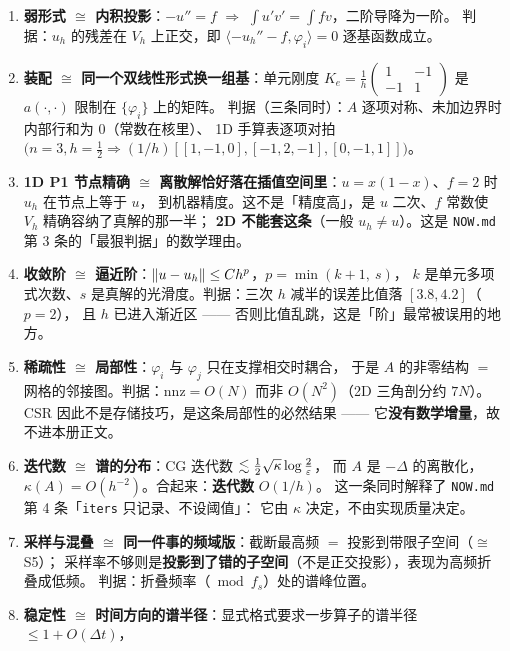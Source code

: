 \begin{enumerate}[leftmargin=1.5em]
  \item \textbf{弱形式 $\cong$ 内积投影}：$-u''=f$ $\Rightarrow$ $\int u'v'=\int fv$，二阶导降为一阶。
        判据：$u_h$ 的残差在 $V_h$ 上正交，即 $\langle -u_h''-f,\varphi_i\rangle=0$ 逐基函数成立。
  \item \textbf{装配 $\cong$ 同一个双线性形式换一组基}：单元刚度
        $K_e=\frac1h\begin{pmatrix}1&-1\\-1&1\end{pmatrix}$ 是 $a(\cdot,\cdot)$ 限制在 $\{\varphi_i\}$ 上的矩阵。
        判据（三条同时）：$A$ 逐项对称、未加边界时内部行和为 $0$（常数在核里）、
        1D 手算表逐项对拍 $\bigl(n=3,h=\tfrac12\Rightarrow (1/h)[[1,-1,0],[-1,2,-1],[0,-1,1]]\bigr)$。
  \item \textbf{1D P1 节点精确 $\cong$ 离散解恰好落在插值空间里}：$u=x(1-x)$、$f=2$ 时 $u_h$ 在节点上等于 $u$，
        到机器精度。这不是「精度高」，是 $u$ 二次、$f$ 常数使 $V_h$ 精确容纳了真解的那一半；
        \textbf{2D 不能套这条}（一般 $u_h\ne u$）。这是 \texttt{NOW.md} 第 3 条的「最狠判据」的数学理由。
  \item \textbf{收敛阶 $\cong$ 逼近阶}：$\left\lVert u-u_h\right\rVert\le Ch^{p}$，$p=\min(k+1,\ s)$，
        $k$ 是单元多项式次数、$s$ 是真解的光滑度。判据：三次 $h$ 减半的误差比值落 $[3.8,4.2]$（$p=2$），
        且 $h$ 已进入渐近区 —— 否则比值乱跳，这是「阶」最常被误用的地方。
  \item \textbf{稀疏性 $\cong$ 局部性}：$\varphi_i$ 与 $\varphi_j$ 只在支撑相交时耦合，
        于是 $A$ 的非零结构 $=$ 网格的邻接图。判据：$\mathrm{nnz}=O(N)$ 而非 $O(N^{2})$（2D 三角剖分约 $7N$）。
        CSR 因此不是存储技巧，是这条局部性的必然结果 —— 它\textbf{没有数学增量}，故不进本册正文。
  \item \textbf{迭代数 $\cong$ 谱的分布}：CG 迭代数 $\lesssim\frac12\sqrt{\kappa}\log\frac2{\varepsilon}$，
        而 $A$ 是 $-\Delta$ 的离散化，$\kappa(A)=O(h^{-2})$。合起来：\textbf{迭代数} $O(1/h)$。
        这一条同时解释了 \texttt{NOW.md} 第 4 条「\texttt{iters} 只记录、不设阈值」：
        它由 $\kappa$ 决定，不由实现质量决定。
  \item \textbf{采样与混叠 $\cong$ 同一件事的频域版}：截断最高频 $=$ 投影到带限子空间（$\cong$ S5）；
        采样率不够则是\textbf{投影到了错的子空间}（不是正交投影），表现为高频折叠成低频。
        判据：折叠频率（$\bmod f_s$）处的谱峰位置。
  \item \textbf{稳定性 $\cong$ 时间方向的谱半径}：显式格式要求一步算子的谱半径 $\le 1+O(\Delta t)$，

\end{enumerate}

